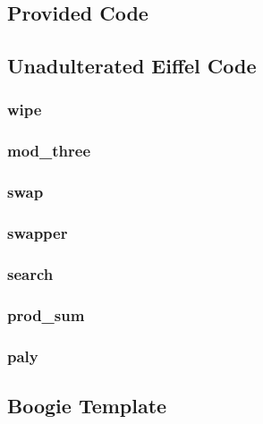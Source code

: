 \begin{appendices}
\section{Provided Code}\label{appendix_code}
\subsection{Unadulterated Eiffel Code}\label{eiffel_code}

\subsubsection{wipe}\label{eiffel_code_wipe}

\pagebreak
\subsubsection{mod\_three}\label{eiffel_code_mod_three}

\pagebreak
\subsubsection{swap}\label{eiffel_code_swap}

\pagebreak
\subsubsection{swapper}\label{eiffel_code_swapper}

\pagebreak
\subsubsection{search}\label{eiffel_code_search}

\pagebreak
\subsubsection{prod\_sum}\label{eiffel_code_prod_sum}

\pagebreak
\subsubsection{paly}\label{eiffel_code_paly}

\pagebreak

\subsection{Boogie Template}\label{boogie_code}

\end{appendices}
